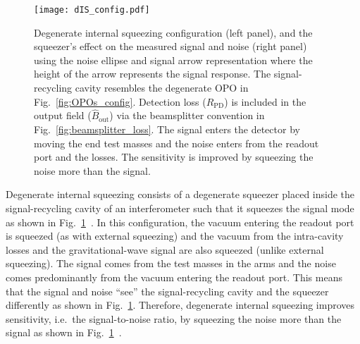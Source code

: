 \begin{figure}[ht]
	\centering
	\texttt{[image: dIS\_config.pdf]}
	\caption{Degenerate internal squeezing configuration (left panel), and the squeezer's effect on the measured signal and noise (right panel) using the noise ellipse and signal arrow representation where the height of the arrow represents the signal response. The signal-recycling cavity resembles the degenerate OPO in Fig.~\ref{fig:OPOs_config}. Detection loss ($R_\text{PD}$) is included in the output field ($\hat{B}_\text{out}$) via the beamsplitter convention in Fig.~\ref{fig:beamsplitter_loss}. The signal enters the detector by moving the end test masses and the noise enters from the readout port and the losses. The sensitivity is improved by squeezing the noise more than the signal.}
	\label{fig:dIS_config}
\end{figure}

Degenerate internal squeezing consists of a degenerate squeezer placed inside the signal-recycling cavity of an interferometer such that it squeezes the signal mode as shown in Fig.~\ref{fig:dIS_config}~\cite{korobkoQuantumExpanderGravitationalwave2019}. In this configuration, the vacuum entering the readout port is squeezed (as with external squeezing) and the vacuum from the intra-cavity losses and the gravitational-wave signal are also squeezed (unlike external squeezing).
The signal comes from the test masses in the arms and the noise comes predominantly from the vacuum entering the readout port. This means that the signal and noise ``see'' the signal-recycling cavity and the squeezer differently as shown in Fig.~\ref{fig:dIS_config}. %
Therefore, degenerate internal squeezing improves sensitivity, i.e.\ the signal-to-noise ratio, by squeezing the noise more than the signal as shown in Fig.~\ref{fig:dIS_config}~\cite{korobkoQuantumExpanderGravitationalwave2019}.


